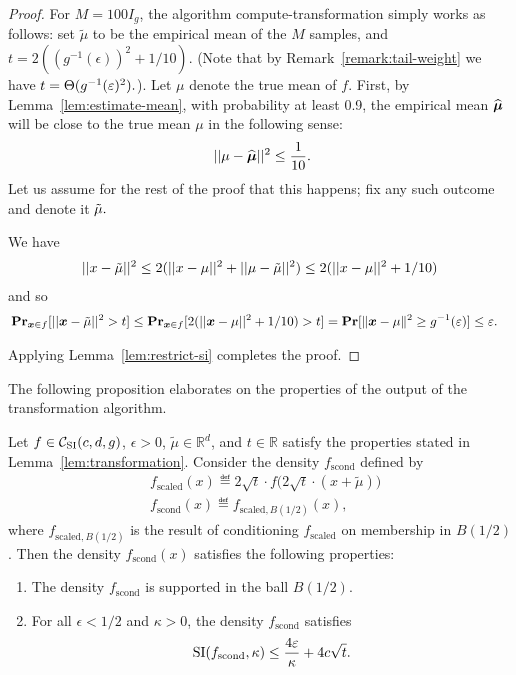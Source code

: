 \begin{proof}
For $M = 100 I_g$, the algorithm
\textsf{compute-transformation} simply works as follows: set
$\tilde{\mu}$ to be the empirical mean of the $M$ samples, and 
$t = 2 ((g^{-1}(\epsilon))^2 + 1/10)$. (Note that by Remark~\ref{remark:tail-weight} we have $t=\Theta(g^{-1}(\varepsilon)^2).$).  Let $\mu$ denote the true mean of $f$.  First, 
by Lemma~\ref{lem:estimate-mean}, with
probability at least 0.9, the empirical
mean $\widehat{\boldsymbol{\mu}}$ will be close to the true mean $\mu$ in the
following sense:
\begin{eqnarray}~\label{eq:estimate-mean}
|| \mu-\widehat{\boldsymbol{\mu}} ||^2    \le \frac{1}{10}.
\end{eqnarray}
Let us assume for the rest of the proof that this happens; fix any such outcome and denote it $\tilde{\mu}.$

We have 
\begin{eqnarray*}
|| x - \tilde{\mu} ||^2
 \leq 2 (|| x - \mu ||^2 + || \mu - \tilde{\mu} ||^2) 
 \leq 2 (|| x - \mu ||^2 + 1/10) \\
\end{eqnarray*}
and so
\begin{align*}
& \operatorname{{\bf Pr}}_{\boldsymbol{x} \in f} [ || \boldsymbol{x} - \tilde{\mu} ||^2 > t ] 
  \leq \operatorname{{\bf Pr}}_{\boldsymbol{x} \in f} [ 2 (|| \boldsymbol{x} - \mu ||^2 + 1/10) > t ] 
 = \operatorname{{\bf Pr}}[\|\boldsymbol{x} - \mu\|^2 \geq g^{-1}(\varepsilon)]
 \leq \varepsilon.
\end{align*}

Applying Lemma~\ref{lem:restrict-si} completes the proof.
\end{proof}

The following proposition elaborates on the properties of the output
of the transformation algorithm.
 
\begin{lemma} \label{lem:properties}
Let $f \in {\mathcal C}_{\mathrm{SI}}(c,d,g)$, $\epsilon>0$, $\tilde{\mu} \in \mathbb{R}^d$,
and $t \in \mathbb{R}$ satisfy the properties stated in
Lemma~\ref{lem:transformation}. Consider the density
$f_{\mathrm{scond}}$ defined by
\begin{align*}
& f_{\mathrm{scaled}}(x) \eqdef 2\sqrt{t} \cdot f\big(2\sqrt{t} \cdot {( x+\tilde{\mu})}  \big) \\
& f_{\mathrm{scond}}(x) \eqdef f_{\mathrm{scaled}, B(1/2)}(x  ),
\end{align*}
where $f_{\mathrm{scaled}, B(1/2)}$ is the result of conditioning $f_{\mathrm{scaled}}$ on membership in $B(1/2)$.
Then the density $f_{\mathrm{scond}}(x)$ satisfies the following properties: 
\begin{enumerate}
\item The density $f_{\mathrm{scond}}$ is supported in the ball $B(1/2)$. 
\item For all $\epsilon < 1/2$
and $\kappa > 0$, the density $f_{\mathrm{scond}}$ 
satisfies
\[
{\mathrm{SI}}(f_{\mathrm{scond}},\kappa) \leq \frac{4 \varepsilon}{\kappa} + 4 c \sqrt{t}.\]
\end{enumerate}
\end{lemma}

